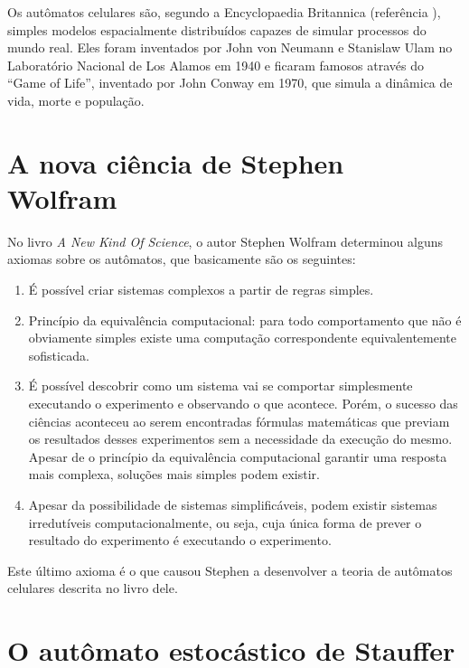 \documentclass[
	12pt,				%
	openright,			%
	twoside,			%
	a4paper,			%
	english,			%
	french,				%
	spanish,			%
	brazil				%
	]{abntex2}
\begin{document}
Os autômatos celulares são, segundo a Encyclopaedia Britannica (referência \cite{britannica3}), simples modelos espacialmente distribuídos capazes de simular processos do mundo real. Eles foram inventados por John von Neumann e Stanislaw Ulam no Laboratório Nacional de Los Alamos em 1940 e ficaram famosos através do ``Game of Life'', inventado por John Conway em 1970, que simula a dinâmica de vida, morte e população.

\section*{A nova ciência de Stephen Wolfram}

No livro \textit{A New Kind Of Science}, o autor Stephen Wolfram determinou alguns axiomas sobre os autômatos, que basicamente são os seguintes:
\begin{enumerate}
	\item É possível criar sistemas complexos a partir de regras simples.
	\item Princípio da equivalência computacional: para todo comportamento que não é obviamente simples  existe uma computação correspondente equivalentemente sofisticada.
	\item É possível descobrir como um sistema vai se comportar simplesmente executando o experimento e observando o que acontece. Porém, o sucesso das ciências aconteceu ao serem encontradas fórmulas matemáticas que previam os resultados desses experimentos sem a necessidade da execução do mesmo. Apesar de o princípio da equivalência computacional garantir uma resposta mais complexa, soluções mais simples podem existir.
	\item Apesar da possibilidade de sistemas simplificáveis, podem existir sistemas irredutíveis computacionalmente, ou seja, cuja única forma de prever o resultado do experimento é executando o experimento.
\end{enumerate}
Este último axioma é o que causou Stephen a desenvolver a teoria de autômatos celulares descrita no livro dele.

\section*{O autômato estocástico de Stauffer}
\end{document}
